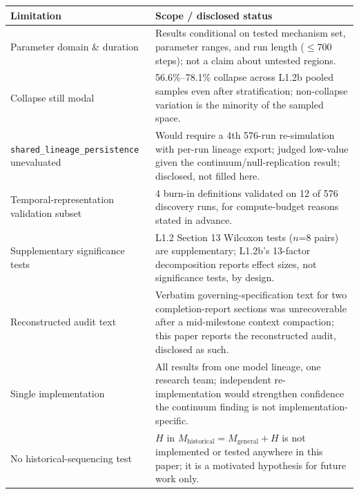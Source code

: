 \begin{tabular}{@{}p{}p{}@{}}
\toprule
\textbf{Limitation} & \textbf{Scope / disclosed status} \\
\midrule
Parameter domain \& duration & Results conditional on tested mechanism set, parameter ranges, and run length ($\le$700 steps); not a claim about untested regions. \\
Collapse still modal & 56.6\%--78.1\% collapse across L1.2b pooled samples even after stratification; non-collapse variation is the minority of the sampled space. \\
\texttt{shared\_lineage\_persistence} unevaluated & Would require a 4th 576-run re-simulation with per-run lineage export; judged low-value given the continuum/null-replication result; disclosed, not filled here. \\
Temporal-representation validation subset & 4 burn-in definitions validated on 12 of 576 discovery runs, for compute-budget reasons stated in advance. \\
Supplementary significance tests & L1.2 Section 13 Wilcoxon tests ($n$=8 pairs) are supplementary; L1.2b's 13-factor decomposition reports effect sizes, not significance tests, by design. \\
Reconstructed audit text & Verbatim governing-specification text for two completion-report sections was unrecoverable after a mid-milestone context compaction; this paper reports the reconstructed audit, disclosed as such. \\
Single implementation & All results from one model lineage, one research team; independent re-implementation would strengthen confidence the continuum finding is not implementation-specific. \\
No historical-sequencing test & $H$ in $M_{\text{historical}}=M_{\text{general}}+H$ is not implemented or tested anywhere in this paper; it is a motivated hypothesis for future work only. \\
\bottomrule
\end{tabular}
